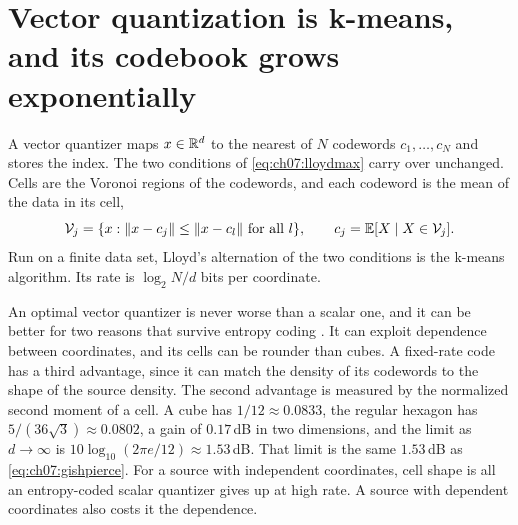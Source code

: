 

\section{Vector quantization is k-means, and its codebook grows exponentially}\label{sec:ch07:vq}

A vector quantizer maps $x\in\mathbb{R}^d$ to the nearest of $N$ codewords $c_1,\dots,c_N$ and stores the index. The two conditions of \cref{eq:ch07:lloydmax} carry over unchanged. Cells are the Voronoi regions of the codewords, and each codeword is the mean of the data in its cell,
\begin{equation}\label{eq:ch07:kmeans}
\mathcal V_j=\{x:\lVert x-c_j\rVert\le\lVert x-c_l\rVert\ \text{for all}\ l\},\qquad c_j=\mathbb{E}[X\mid X\in\mathcal V_j].
\end{equation}
Run on a finite data set, Lloyd's alternation of the two conditions is the k-means algorithm. Its rate is $\log_2N/d$ bits per coordinate.

An optimal vector quantizer is never worse than a scalar one, and it can be better for two reasons that survive entropy coding \cite{grayneuhoff1998}. It can exploit dependence between coordinates, and its cells can be rounder than cubes. A fixed-rate code has a third advantage, since it can match the density of its codewords to the shape of the source density. The second advantage is measured by the normalized second moment of a cell. A cube has $1/12\approx0.0833$, the regular hexagon has $5/(36\sqrt3)\approx0.0802$, a gain of $0.17$\,dB in two dimensions, and the limit as $d\to\infty$ is $10\log_{10}(2\pi e/12)\approx1.53$\,dB. That limit is the same $1.53$\,dB as \cref{eq:ch07:gishpierce}. For a source with independent coordinates, cell shape is all an entropy-coded scalar quantizer gives up at high rate. A source with dependent coordinates also costs it the dependence.

